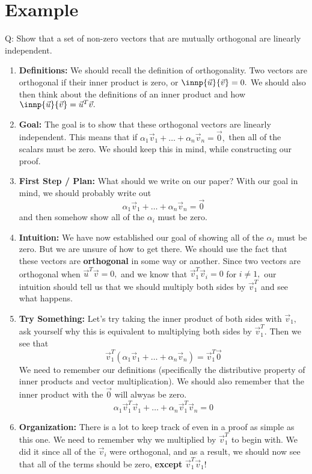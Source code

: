 \section{Example}
Q: Show that a set of non-zero vectors that are mutually orthogonal are linearly independent.
\begin{enumerate}
 \item \textbf{Definitions:} We should recall the definition of orthogonality. 
  Two vectors are orthogonal if their inner product is zero, or $\innp{\vec{u}}{\vec{v}} = 0.$ 
  We should also then think about the definitions of an inner product and how $\innp{\vec{u}}{\vec{v}} = \vec{u}^{T} \vec{v}.$
 \item \textbf{Goal:} The goal is to show that these orthogonal vectors are linearly independent.
 This means that if $\alpha_{1} \vec{v}_{1} + \dotsc + \alpha_{n} \vec{v}_{n} = \vec{0},$ then all of the scalars must be zero.
 We should keep this in mind, while constructing our proof.
 \item \textbf{First Step / Plan:} What should we write on our paper? With our goal in mind, we should probably write out 
 $$\alpha_{1} \vec{v}_{1} + \dotsc + \alpha_{n} \vec{v}_{n} = \vec{0}$$
 and then somehow show all of the $\alpha_{i}$ must be zero.
 \item \textbf{Intuition:} We have now established our goal of showing all of the $\alpha_{i}$ must be zero.
 But we are unsure of how to get there. We should use the fact that these vectors are \textbf{orthogonal} in some way or another. 
 Since two vectors are orthogonal when $\vec{u}^{T} \vec{v} = 0,$ and we know that $\vec{v}_{1}^{T} \vec{v}_{i} = 0$ for $i \neq 1,$ our intuition should tell us that we should multiply both sides by $\vec{v}_{1}^{T}$ and see what happens.
 \item \textbf{Try Something:} Let's try taking the inner product of both sides with $\vec{v}_{1},$ ask yourself why this is equivalent to multiplying both sides by $\vec{v}_{1}^{T}.$ Then we see that
 $$\vec{v}_{1}^{T} (\alpha_{1} \vec{v}_{1} + \dotsc + \alpha_{n} \vec{v}_{n}) = \vec{v}_{1}^{T} \vec{0}$$
 We need to remember our definitions (specifically the distributive property of inner products and vector multiplication).
 We should also remember that the inner product with the $\vec{0}$ will alwyas be zero.
 $$\alpha_{1} \vec{v}_{1}^{T} \vec{v}_{1} + \dotsc + \alpha_{n} \vec{v}_{1}^{T} \vec{v}_{n} = 0$$
 \item \textbf{Organization:}
 There is a lot to keep track of even in a proof as simple as this one. We need to remember why we multiplied by $\vec{v}_{1}^{T}$ to begin with. We did it since all of the $\vec{v}_{i}$ were orthogonal, and as a result, we should now see that all of the terms should be zero, \textbf{except} $\vec{v}_{1}^{T} \vec{v}_{1}!$


\end{enumerate}

